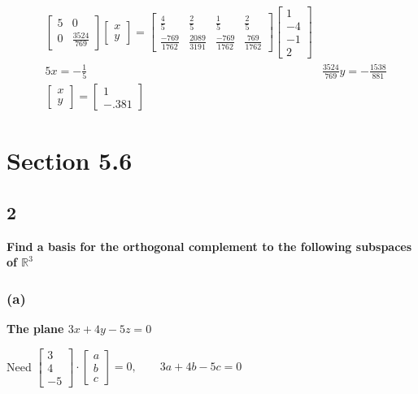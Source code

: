 \documentclass[10pt,letterpaper]{article}
\newcommand{\R}{\mathbb{R}}
\begin{document}
	\begin{align*}
	& \begin{bmatrix}
	5 & 0 \\ 0 & \frac{3524}{769}
	\end{bmatrix} \begin{bmatrix}
	x \\ y
	\end{bmatrix} = \begin{bmatrix}
	\frac{4}{5} & \frac{2}{5}  & \frac{1}{5} & \frac{2}{5} \\ 
	\frac{-769}{1762} & \frac{2089}{3191}  & \frac{-769}{1762} & \frac{769}{1762}
	\end{bmatrix} \begin{bmatrix}
	1 \\ -4 \\ -1 \\ 2
	\end{bmatrix} \\ 
	& 5x = -\frac{1}{5} & \frac{3524}{769}y = -\frac{1538}{881} \\
	& \boxed{\begin{bmatrix}
		x \\ y
		\end{bmatrix} = \begin{bmatrix}
		1 \\ -.381
		\end{bmatrix}}
	\end{align*}
	\section*{Section 5.6}
	\subsection*{2} \textbf{Find a basis for the orthogonal complement to the following subspaces of $\R^3$} 
	\subsubsection*{(a)} \textbf{The plane $3x + 4y - 5z = 0$} 
	
	Need $\begin{bmatrix}
	3 \\ 4 \\ -5
	\end{bmatrix} \cdot \begin{bmatrix}
	a \\ b \\ c
	\end{bmatrix} = 0, \qquad 3a + 4b - 5c = 0$
	
\end{document}
